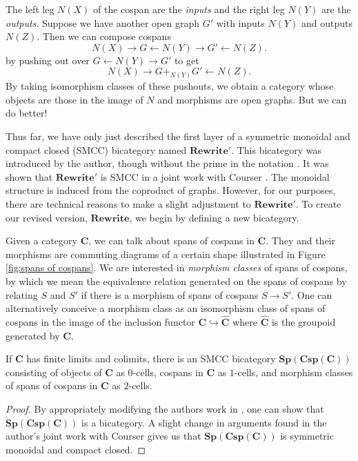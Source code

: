 \documentclass[a4paper,UKenglish]{lipics-v2016}
\begin{document}
The left leg $N(X)$ of the cospan are the \emph{inputs} and the right leg $N(Y)$ are the \emph{outputs}.  Suppose we have another open graph $G'$ with inputs $N(Y)$ and outputs $N(Z)$.  Then we can compose cospans 
\[
N(X) \to G \gets N(Y) \to G' \gets N(Z). 
\] 
by pushing out over $G \gets N(Y) \to G'$ to get 
\[
N(X) \to G +_{N(Y)} G' \gets N(Z).
\] 
By taking isomorphism classes of these pushouts, we obtain a category whose objects are those in the image of $N$ and morphisms are open graphs. But we can do better! 

Thus far, we have only just described the first layer of a symmetric monoidal and compact closed (SMCC) bicategory named $\mathbf{Rewrite'}$.  This bicategory was introduced by the author, though without the prime in the notation \cite{Cicala_SpansCospans}. It was shown that $\mathbf{Rewrite'}$ is SMCC in a joint work with Courser \cite{CicalaCourser_BicatSpansCospan}. The monoidal structure is induced from the coproduct of graphs.  However, for our purposes, there are technical reasons to make a slight adjustment to $\mathbf{Rewrite'}$.  To create our revised version, $\mathbf{Rewrite}$, we begin by defining a new bicategory.

Given a category $\mathbf{C}$, we can talk about spans of cospans in $\mathbf{C}$.  They and their morphisms are commuting diagrams of a certain shape illustrated in Figure \ref{fig:spans of cospans}.  We are interested in \emph{morphism classes} of spans of cospans, by which we mean the equivalence relation generated on the spans of cospans by relating $S$ and $S'$ if there is a morphism of spans of cospans $S \to S'$.  One can alternatively conceive a morphism class as an isomorphism class of spans of cospans in the image of the inclusion functor $\mathbf{C} \hookrightarrow \widehat{\mathbf{C}}$ where $\widehat{\mathbf{C}}$ is the groupoid generated by $\mathbf{C}$.   

\begin{theorem}
	\label{thm:SpCspC is SMCC bicategory}
	If $\mathbf{C}$ has finite limits and colimits, there is an SMCC bicategory $\mathbf{Sp}(\mathbf{Csp}(\mathbf{C}))$ consisting of objects of $\mathbf{C}$ as $0$-cells, cospans in $\mathbf{C}$ as $1$-cells, and morphism classes of spans of cospans in $\mathbf{C}$ as $2$-cells. 
\end{theorem}
\begin{proof}
	By appropriately modifying the authors work in \cite{Cicala_SpansCospans}, one can show that $\mathbf{Sp}(\mathbf{Csp}(\mathbf{C}))$ is a bicategory.  A slight change in arguments found in the author's joint work with Courser \cite{CicalaCourser_BicatSpansCospan} gives us that $\mathbf{Sp}(\mathbf{Csp}(\mathbf{C}))$ is symmetric monoidal and compact closed.
\end{proof}
\end{document}
